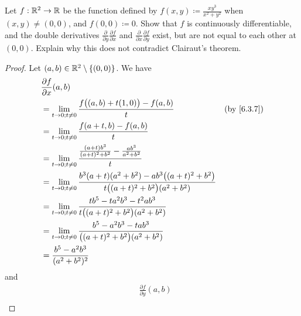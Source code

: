 \exercisesection

\begin{ex}\label{ex:6.5.1}
  Let \(f : \mathbb{R}^2 \to \mathbb{R}\) be the function defined by \(f(x, y) \coloneqq \frac{x y^3}{x^2 + y^2}\) when \((x, y) \neq (0, 0)\), and \(f(0, 0) \coloneqq 0\).
  Show that \(f\) is continuously differentiable, and the double derivatives \(\frac{\partial}{\partial y} \frac{\partial f}{\partial x}\) and \(\frac{\partial}{\partial x} \frac{\partial f}{\partial y}\) exist, but are not equal to each other at \((0, 0)\).
  Explain why this does not contradict Clairaut's theorem.
\end{ex}

\begin{proof}
  Let \((a, b) \in \mathbb{R}^2 \setminus \{(0, 0)\}\).
  We have
  \begin{align*}
     & \frac{\partial f}{\partial x}(a, b)                                                                                                                              \\
     & = \lim_{t \to 0 ; t \neq 0} \frac{f\big((a, b) + t(1, 0)\big) - f(a, b)}{t}                                                           & \text{(by \cref{6.3.7})} \\
     & = \lim_{t \to 0 ; t \neq 0} \frac{f(a + t, b) - f(a, b)}{t}                                                                                                      \\
     & = \lim_{t \to 0 ; t \neq 0} \frac{\frac{(a + t) b^3}{(a + t)^2 + b^2} - \frac{ab^3}{a^2 + b^2}}{t}                                                               \\
     & = \lim_{t \to 0 ; t \neq 0} \frac{b^3 (a + t) (a^2 + b^2) - a b^3 \big((a + t)^2 + b^2\big)}{t \big((a + t)^2 + b^2\big) (a^2 + b^2)}                            \\
     & = \lim_{t \to 0 ; t \neq 0} \frac{t b^5 - t a^2 b^3 - t^2 a b^3}{t \big((a + t)^2 + b^2\big) (a^2 + b^2)}                                                        \\
     & = \lim_{t \to 0 ; t \neq 0} \frac{b^5 - a^2 b^3 - t a b^3}{\big((a + t)^2 + b^2\big) (a^2 + b^2)}                                                                \\
     & = \frac{b^5 - a^2 b^3}{(a^2 + b^2)^2}
  \end{align*}
  and
  \begin{align*}
     & \frac{\partial f}{\partial y}(a, b)                                                                                                                                \\

\end{align*}
\end{proof}
